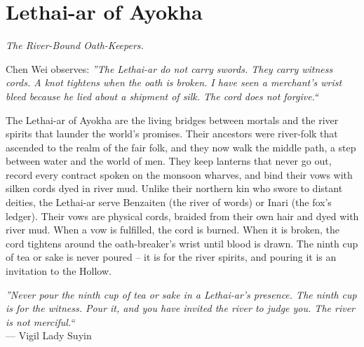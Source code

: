 \documentclass[12pt,oneside]{book}
\begin{document}
\newpage

\newpage

\chapter{Lethai-ar of Ayokha}
\emph{The River-Bound Oath-Keepers.}

\noindent
Chen Wei observes: \textit{''The Lethai-ar do not carry swords. They carry witness cords. A knot tightens when the oath is broken. I have seen a merchant's wrist bleed because he lied about a shipment of silk. The cord does not forgive.``}

\noindent
The Lethai-ar of Ayokha are the living bridges between mortals and the river spirits that launder the world's promises. Their ancestors were river-folk that ascended to the realm of the fair folk, and they now walk the middle path, a step between water and the world of men. They keep lanterns that never go out, record every contract spoken on the monsoon wharves, and bind their vows with silken cords dyed in river mud. Unlike their northern kin who swore to distant deities, the Lethai-ar serve Benzaiten (the river of words) or Inari (the fox's ledger). Their vows are physical cords, braided from their own hair and dyed with river mud. When a vow is fulfilled, the cord is burned. When it is broken, the cord tightens around the oath-breaker's wrist until blood is drawn. The ninth cup of tea or sake is never poured -- it is for the river spirits, and pouring it is an invitation to the Hollow.

\vspace{0.5em}
\noindent\textit{''Never pour the ninth cup of tea or sake in a Lethai-ar's presence. The ninth cup is for the witness. Pour it, and you have invited the river to judge you. The river is not merciful.``} \\
--- Vigil Lady Suyin
\end{document}
